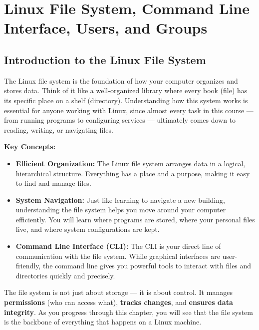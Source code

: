 
\chapter{Linux File System, Command Line Interface, Users, and Groups}
\label{ch:users-groups}

\section{Introduction to the Linux File System}

The Linux file system is the foundation of how your computer organizes and stores data.
Think of it like a well-organized library where every book (file) has its specific place on a shelf (directory).
Understanding how this system works is essential for anyone working with Linux, since almost every task in this course — from running programs to configuring services — ultimately comes down to reading, writing, or navigating files.

\textbf{Key Concepts:}
\begin{itemize}
    \item \textbf{Efficient Organization:} The Linux file system arranges data in a logical, hierarchical structure. Everything has a place and a purpose, making it easy to find and manage files.
    \item \textbf{System Navigation:} Just like learning to navigate a new building, understanding the file system helps you move around your computer efficiently. You will learn where programs are stored, where your personal files live, and where system configurations are kept.
    \item \textbf{Command Line Interface (CLI):} The CLI is your direct line of communication with the file system. While graphical interfaces are user-friendly, the command line gives you powerful tools to interact with files and directories quickly and precisely.
\end{itemize}

The file system is not just about storage — it is about control. It manages \textbf{permissions} (who can access what), \textbf{tracks changes}, and \textbf{ensures data integrity}.
As you progress through this chapter, you will see that the file system is the backbone of everything that happens on a Linux machine.

